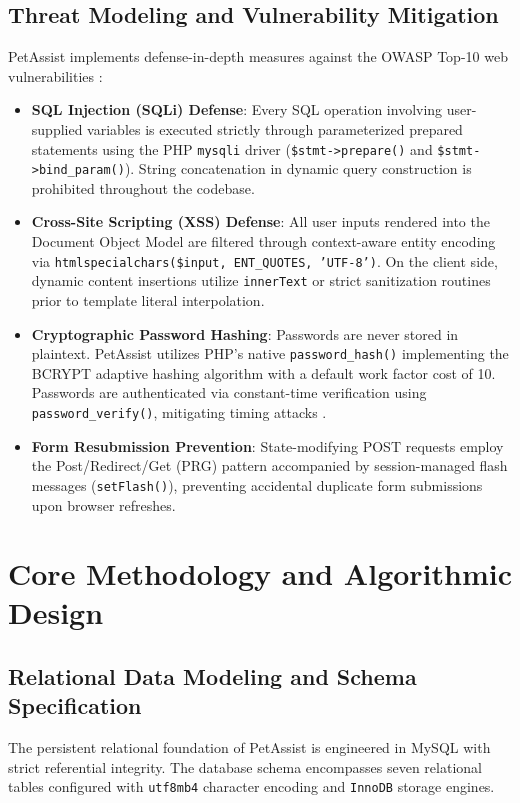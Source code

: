 \documentclass[conference]{IEEEtran}
\begin{document}
\subsection{Threat Modeling and Vulnerability Mitigation}
PetAssist implements defense-in-depth measures against the OWASP Top-10 web vulnerabilities \cite{owasp2021}:
\begin{itemize}
    \item \textbf{SQL Injection (SQLi) Defense}: Every SQL operation involving user-supplied variables is executed strictly through parameterized prepared statements using the PHP \texttt{mysqli} driver (\texttt{\$stmt->prepare()} and \texttt{\$stmt->bind\_param()}). String concatenation in dynamic query construction is prohibited throughout the codebase.
    \item \textbf{Cross-Site Scripting (XSS) Defense}: All user inputs rendered into the Document Object Model are filtered through context-aware entity encoding via \texttt{htmlspecialchars(\$input, ENT\_QUOTES, 'UTF-8')}. On the client side, dynamic content insertions utilize \texttt{innerText} or strict sanitization routines prior to template literal interpolation.
    \item \textbf{Cryptographic Password Hashing}: Passwords are never stored in plaintext. PetAssist utilizes PHP's native \texttt{password\_hash()} implementing the BCRYPT adaptive hashing algorithm with a default work factor cost of 10. Passwords are authenticated via constant-time verification using \texttt{password\_verify()}, mitigating timing attacks \cite{stallings2021}.
    \item \textbf{Form Resubmission Prevention}: State-modifying POST requests employ the Post/Redirect/Get (PRG) pattern accompanied by session-managed flash messages (\texttt{setFlash()}), preventing accidental duplicate form submissions upon browser refreshes.
\end{itemize}

\section{Core Methodology and Algorithmic Design}
\subsection{Relational Data Modeling and Schema Specification}
The persistent relational foundation of PetAssist is engineered in MySQL with strict referential integrity. The database schema encompasses seven relational tables configured with \texttt{utf8mb4} character encoding and \texttt{InnoDB} storage engines.
\end{document}
